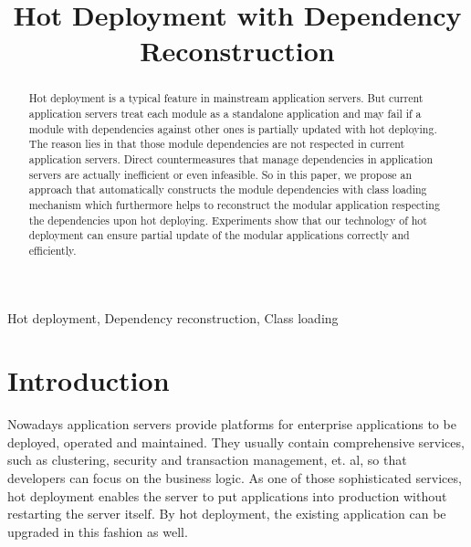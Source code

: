 \documentclass[conference]{IEEEtran}
\begin{document}
\title{Hot Deployment with Dependency Reconstruction}

\author{\IEEEauthorblockN{}
\IEEEauthorblockA{\\
\\
}
}

\maketitle


\begin{abstract}
Hot deployment is a typical feature in mainstream application servers. But current application servers treat each module as a standalone application and may fail if a module with dependencies against other ones is partially updated with hot deploying. The reason lies in that those module dependencies are not respected in current application servers. Direct countermeasures that manage dependencies in application servers are actually inefficient or even infeasible. So in this paper, we propose an approach that automatically constructs the module dependencies with class loading mechanism which furthermore helps to reconstruct the modular application respecting the dependencies upon hot deploying. Experiments show that our technology of hot deployment can ensure partial update of the modular applications correctly and efficiently.
\end{abstract}

\begin{IEEEkeywords}
Hot deployment, Dependency reconstruction, Class loading
\end{IEEEkeywords}


\IEEEpeerreviewmaketitle


\section{Introduction\label{sec:introduction}}

Nowadays application servers\cite{app_server} provide platforms for enterprise applications to be deployed, operated and maintained. They usually contain comprehensive services, such as clustering, security and transaction management, et. al, so that developers can focus on the business logic. As one of those sophisticated services, hot deployment enables the server to put applications into production without restarting the server itself. By hot deployment, the existing application can be upgraded in this fashion as well.
\end{document}

